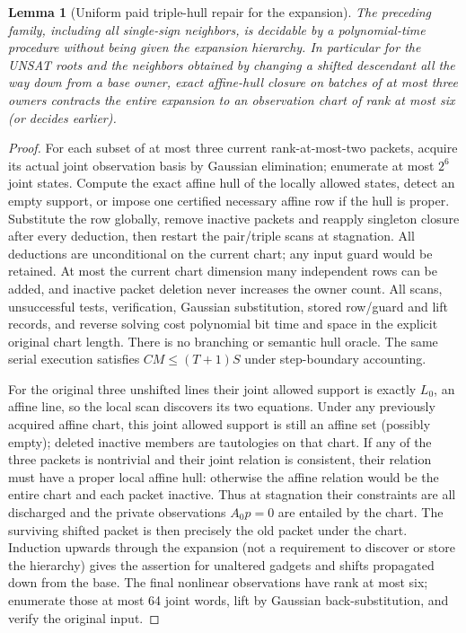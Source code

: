 \documentclass[11pt]{article}
\newtheorem{lemma}[theorem]{Lemma}
\begin{document}
\begin{lemma}[Uniform paid triple-hull repair for the expansion]\label{lem:rt21-repair}
The preceding family, including all single-sign neighbors, is decidable by a polynomial-time procedure without being given the expansion hierarchy. In particular for the UNSAT roots and the neighbors obtained by changing a shifted descendant all the way down from a base owner, exact affine-hull closure on batches of at most three owners contracts the entire expansion to an observation chart of rank at most six (or decides earlier).
\end{lemma}
\begin{proof}
For each subset of at most three current rank-at-most-two packets, acquire its actual joint observation basis by Gaussian elimination; enumerate at most $2^6$ joint states. Compute the exact affine hull of the locally allowed states, detect an empty support, or impose one certified necessary affine row if the hull is proper. Substitute the row globally, remove inactive packets and reapply singleton closure after every deduction, then restart the pair/triple scans at stagnation. All deductions are unconditional on the current chart; any input guard would be retained. At most the current chart dimension many independent rows can be added, and inactive packet deletion never increases the owner count. All scans, unsuccessful tests, verification, Gaussian substitution, stored row/guard and lift records, and reverse solving cost polynomial bit time and space in the explicit original chart length. There is no branching or semantic hull oracle. The same serial execution satisfies $CM\le(T+1)S$ under step-boundary accounting.

For the original three unshifted lines their joint allowed support is exactly $L_0$, an affine line, so the local scan discovers its two equations. Under any previously acquired affine chart, this joint allowed support is still an affine set (possibly empty); deleted inactive members are tautologies on that chart. If any of the three packets is nontrivial and their joint relation is consistent, their relation must have a proper local affine hull: otherwise the affine relation would be the entire chart and each packet inactive. Thus at stagnation their constraints are all discharged and the private observations $A_0p=0$ are entailed by the chart. The surviving shifted packet is then precisely the old packet under the chart. Induction upwards through the expansion (not a requirement to discover or store the hierarchy) gives the assertion for unaltered gadgets and shifts propagated down from the base. The final nonlinear observations have rank at most six; enumerate those at most 64 joint words, lift by Gaussian back-substitution, and verify the original input.


\end{proof}
\end{document}
